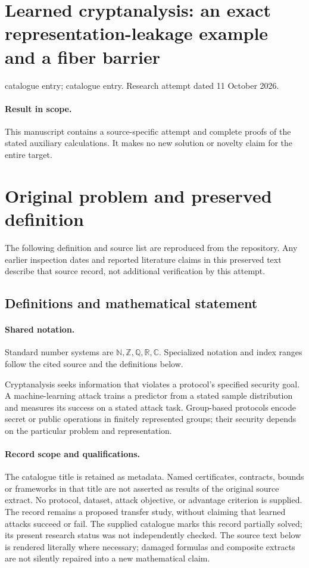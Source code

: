 \documentclass[11pt]{article}
\begin{document}
\section*{Learned cryptanalysis: an exact representation-leakage example and a fiber barrier}
\noindent catalogue entry; catalogue entry. Research attempt dated 11 October 2026.
\paragraph{Result in scope.}This manuscript contains a source-specific attempt and complete proofs of the stated auxiliary calculations. It makes no new solution or novelty claim for the entire target.
\section{Original problem and preserved definition}
The following definition and source list are reproduced from the repository. Any earlier inspection dates and reported literature claims in this preserved text describe that source record, not additional verification by this attempt.
\subsection{Definitions and mathematical statement}

\paragraph{Shared notation.}Standard number systems are $\mathbb N,\mathbb Z,\mathbb Q,\mathbb R,\mathbb C$. Specialized notation and index ranges follow the cited source and the definitions below.


Cryptanalysis seeks information that violates a protocol's specified security goal. A machine-learning attack trains a predictor from a stated sample distribution and measures its success on a stated attack task. Group-based protocols encode secret or public operations in finitely represented groups; their security depends on the particular problem and representation.
\paragraph{Record scope and qualifications.}
The catalogue title is retained as metadata. Named certificates, contracts, bounds or frameworks in that title are not asserted as results of the original source extract.
No protocol, dataset, attack objective, or advantage criterion is supplied. The record remains a proposed transfer study, without claiming that learned attacks succeed or fail. The supplied catalogue marks this record partially solved; its present research status was not independently checked.
The source text below is rendered literally where necessary; damaged formulas and composite extracts are not silently repaired into a new mathematical claim.
\end{document}
